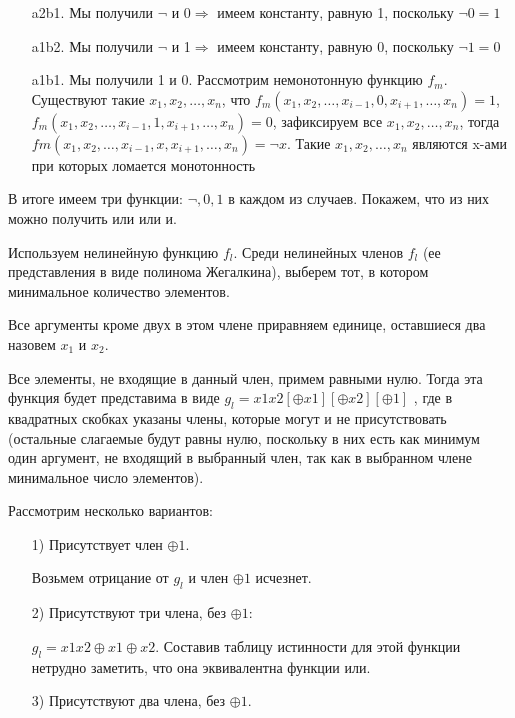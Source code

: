 \documentclass{article}
\begin{document}
\begin{enumerate}
\begin{enumerate}
\begin{enumerate}
        \item[a2b1.] Мы получили $\neg$ и 0$\Rightarrow$ имеем константу, равную 1, поскольку $\neg 0=1$

        \item[a1b2.] Мы получили $\neg$ и 1$\Rightarrow$ имеем константу, равную 0, поскольку $\neg 1=0$

        \item[a1b1.] Мы получили 1 и 0. Рассмотрим немонотонную функцию $f_m$. Существуют такие $x_1,x_2,\ldots,x_n$, что $f_m(x_1,x_2,\ldots,x_{i-1},0,x_{i+1},\ldots,x_n)=1$, 
        $f_m(x_1,x_2,…,x_{i-1},1,x_{i+1},\ldots,x_n)=0$, зафиксируем все $x_1,x_2,…,x_n$, тогда $fm(x_1,x_2,…,x_{i-1},x,x_{i+1},\ldots,x_n)=\neg x$.  Такие   $x_1,x_2,\ldots,x_n$ являются x-ами при которых ломается монотонность

    \end{enumerate}
    В итоге  имеем три функции: $\neg, 0, 1$ в каждом из случаев. Покажем, что из них можно получить или или и.

    Используем нелинейную функцию $f_l$. Среди нелинейных членов $f_l$
 (ее представления в виде полинома Жегалкина), выберем тот, в котором минимальное количество элементов. 
 
 Все аргументы кроме двух в этом члене приравняем единице, оставшиеся два назовем $x_1$
 и $x_2$. 
 
 Все элементы, не входящие в данный член, примем равными нулю. Тогда эта функция будет представима в виде $g_l=x1x2[\oplus x1][\oplus x2][\oplus 1]$ 
, где в квадратных скобках указаны члены, которые могут и не присутствовать (остальные слагаемые будут равны нулю, поскольку в них есть как минимум один аргумент, не входящий в выбранный член, так как в выбранном члене минимальное число элементов).

Рассмотрим несколько вариантов:

\begin{enumerate}
    \item[1)] Присутствует член  $\oplus 1$.
    
    Возьмем отрицание от $g_l$ и член $\oplus 1$ исчезнет.
    \item[2)] Присутствуют три члена, без $\oplus 1:$
    
    $ g_l=x1x2\oplus x1 \oplus  x2$. Составив таблицу истинности для этой функции нетрудно заметить, что она эквивалентна функции или.
    \item[3)] Присутствуют два члена, без  $\oplus 1$.
    

\end{enumerate}
\end{enumerate}
\end{enumerate}
\end{document}
